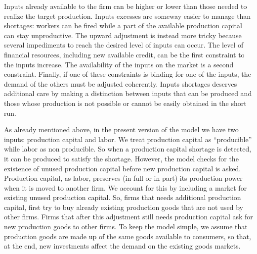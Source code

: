 \documentclass{book}
\begin{document}
Inputs already available to the firm can be higher or lower than those needed to realize the target production. Inputs excesses are someway easier to manage than shortages: workers can be fired while a part of the available production capital can stay unproductive.
The upward adjustment is instead more tricky because 
several impediments to reach the desired level of inputs can occur.
The level of financial resources, including new available credit, can be the first constraint to the inputs increase. The availability of the inputs on the market is a second constraint. Finally, if one of these constraints is binding for one of the inputs, the demand of the others must be adjusted coherently. Inputs shortages deserves additional care by making a distinction between inputs that can be produced and those whose production is not possible or cannot be easily obtained in the short run. 

\label{pg:inputs2}
As already mentioned above, in the present version of the model we have two inputs: production capital and labor. We treat production capital as ``producible'' while labor as non producible. So when a production capital shortage is detected, it can be produced to satisfy the shortage. However, the model checks for the existence of unused production capital before new production capital is asked.
Production capital, as labor, preserves (in full or in part) its production power when it is moved to another firm. %
We account for this by including a market for existing unused production capital. So, firms that needs additional production capital, first try to buy already existing production goods that are not used by other firms. Firms that after this adjustment still needs production capital ask for new production goods to other firms. To keep the model simple, we assume that production goods are made up of the same goods available to consumers, so that, at the end, new investments affect the demand on the existing goods markets.


\end{document}
